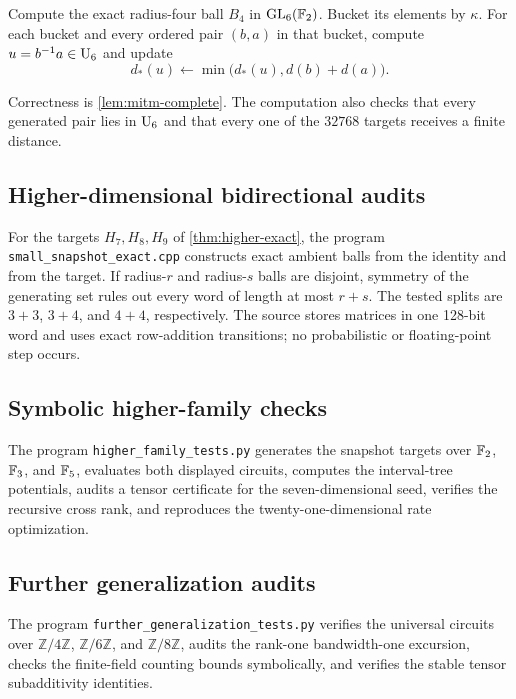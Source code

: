 \begin{algorithm}
Compute the exact radius-four ball $B_4$ in $\operatorname{GL}_6(\mathbb F_2)$.  Bucket its elements by $\kappa$.  For each bucket and every ordered pair $(b,a)$ in that bucket, compute $u=b^{-1}a\in\operatorname{U}_6$ and update
\[
d_*(u)\leftarrow
\min\bigl(d_*(u),d(b)+d(a)\bigr).
\]
\end{algorithm}

Correctness is \cref{lem:mitm-complete}.  The computation also checks that every generated pair lies in $\operatorname{U}_6$ and that every one of the $32768$ targets receives a finite distance.

\subsection{Higher-dimensional bidirectional audits}

For the targets $H_7,H_8,H_9$ of \cref{thm:higher-exact}, the program \texttt{small\_snapshot\_exact.cpp} constructs exact ambient balls from the identity and from the target.  If radius-$r$ and radius-$s$ balls are disjoint, symmetry of the generating set rules out every word of length at most $r+s$.  The tested splits are $3+3$, $3+4$, and $4+4$, respectively.  The source stores matrices in one 128-bit word and uses exact row-addition transitions; no probabilistic or floating-point step occurs.

\subsection{Symbolic higher-family checks}

The program \texttt{higher\_family\_tests.py} generates the snapshot targets over $\mathbb F_2$, $\mathbb F_3$, and $\mathbb F_5$, evaluates both displayed circuits, computes the interval-tree potentials, audits a tensor certificate for the seven-dimensional seed, verifies the recursive cross rank, and reproduces the twenty-one-dimensional rate optimization.

\subsection{Further generalization audits}

The program \texttt{further\_generalization\_tests.py} verifies the universal circuits over $\mathbb Z/4\mathbb Z$, $\mathbb Z/6\mathbb Z$, and $\mathbb Z/8\mathbb Z$, audits the rank-one bandwidth-one excursion, checks the finite-field counting bounds symbolically, and verifies the stable tensor subadditivity identities.

